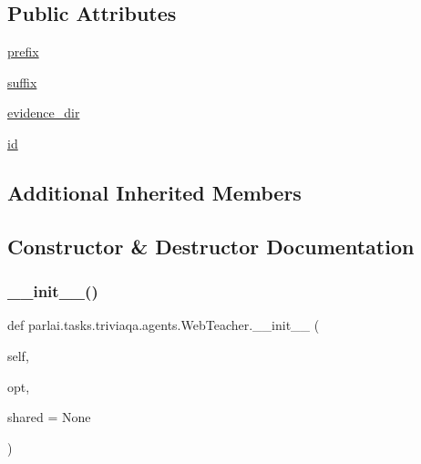 \subsection*{Public Attributes}
\begin{DoxyCompactItemize}
\item 
\hyperlink{classparlai_1_1tasks_1_1triviaqa_1_1agents_1_1WebTeacher_ab62932f9cf9704abc101d924f279a8a1}{prefix}
\item 
\hyperlink{classparlai_1_1tasks_1_1triviaqa_1_1agents_1_1WebTeacher_adfa79e6153ab8900eff1853bba6def9c}{suffix}
\item 
\hyperlink{classparlai_1_1tasks_1_1triviaqa_1_1agents_1_1WebTeacher_a290c1e778391be704efed2dfe06bed25}{evidence\+\_\+dir}
\item 
\hyperlink{classparlai_1_1tasks_1_1triviaqa_1_1agents_1_1WebTeacher_aa997ce2a0c127b3cfc6391a0472fa9d3}{id}
\end{DoxyCompactItemize}
\subsection*{Additional Inherited Members}


\subsection{Constructor \& Destructor Documentation}
\mbox{\label{classparlai_1_1tasks_1_1triviaqa_1_1agents_1_1WebTeacher_a13bb3abbde8cd219d61e2093d38f7210}} 
\subsubsection{\texorpdfstring{\+\_\+\+\_\+init\+\_\+\+\_\+()}{\_\_init\_\_()}}
{\footnotesize\ttfamily def parlai.\+tasks.\+triviaqa.\+agents.\+Web\+Teacher.\+\_\+\+\_\+init\+\_\+\+\_\+ (\begin{DoxyParamCaption}\item[{}]{self,  }\item[{}]{opt,  }\item[{}]{shared = {\ttfamily None} }\end{DoxyParamCaption})}



